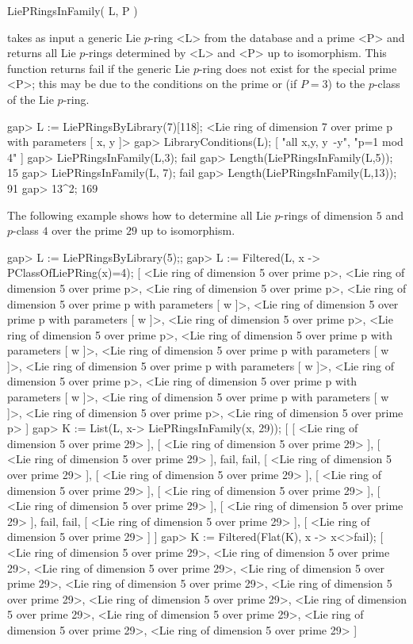 \> LiePRingsInFamily( L, P )

takes as input a generic Lie $p$-ring <L> from the database and a prime <P> 
and returns all Lie $p$-rings determined by <L> and <P> up to isomorphism. 
This function returns fail if the generic Lie $p$-ring does not exist for 
the special prime <P>; this may be due to the conditions on the prime or
(if $P=3$) to the $p$-class of the Lie $p$-ring. 

\beginexample
gap> L := LiePRingsByLibrary(7)[118];
<Lie ring of dimension 7 over prime p with parameters [ x, y ]>
gap> LibraryConditions(L);
[ "all x,y, y~-y", "p=1 mod 4" ]
gap> LiePRingsInFamily(L,3);
fail
gap> Length(LiePRingsInFamily(L,5));
15
gap> LiePRingsInFamily(L, 7);
fail
gap> Length(LiePRingsInFamily(L,13));
91
gap> 13^2;
169
\endexample

The following example shows how to determine all Lie $p$-rings of dimension
$5$ and $p$-class $4$ over the prime $29$ up to isomorphism.

\beginexample
gap> L := LiePRingsByLibrary(5);;
gap> L := Filtered(L, x -> PClassOfLiePRing(x)=4);
[ <Lie ring of dimension 5 over prime p>, 
  <Lie ring of dimension 5 over prime p>, 
  <Lie ring of dimension 5 over prime p>, 
  <Lie ring of dimension 5 over prime p with parameters [ w ]>, 
  <Lie ring of dimension 5 over prime p with parameters [ w ]>, 
  <Lie ring of dimension 5 over prime p>, 
  <Lie ring of dimension 5 over prime p>, 
  <Lie ring of dimension 5 over prime p with parameters [ w ]>, 
  <Lie ring of dimension 5 over prime p with parameters [ w ]>, 
  <Lie ring of dimension 5 over prime p with parameters [ w ]>, 
  <Lie ring of dimension 5 over prime p>, 
  <Lie ring of dimension 5 over prime p with parameters [ w ]>, 
  <Lie ring of dimension 5 over prime p with parameters [ w ]>, 
  <Lie ring of dimension 5 over prime p>, 
  <Lie ring of dimension 5 over prime p> ]
gap> K := List(L, x-> LiePRingsInFamily(x, 29));
[ [ <Lie ring of dimension 5 over prime 29> ], 
  [ <Lie ring of dimension 5 over prime 29> ], 
  [ <Lie ring of dimension 5 over prime 29> ], fail, fail, 
  [ <Lie ring of dimension 5 over prime 29> ], 
  [ <Lie ring of dimension 5 over prime 29> ], 
  [ <Lie ring of dimension 5 over prime 29> ], 
  [ <Lie ring of dimension 5 over prime 29> ], 
  [ <Lie ring of dimension 5 over prime 29> ], 
  [ <Lie ring of dimension 5 over prime 29> ], fail, fail, 
  [ <Lie ring of dimension 5 over prime 29> ], 
  [ <Lie ring of dimension 5 over prime 29> ] ]
gap> K := Filtered(Flat(K), x -> x<>fail);
[ <Lie ring of dimension 5 over prime 29>, 
  <Lie ring of dimension 5 over prime 29>, 
  <Lie ring of dimension 5 over prime 29>, 
  <Lie ring of dimension 5 over prime 29>, 
  <Lie ring of dimension 5 over prime 29>, 
  <Lie ring of dimension 5 over prime 29>, 
  <Lie ring of dimension 5 over prime 29>, 
  <Lie ring of dimension 5 over prime 29>, 
  <Lie ring of dimension 5 over prime 29>, 
  <Lie ring of dimension 5 over prime 29>, 
  <Lie ring of dimension 5 over prime 29> ]
\endexample


